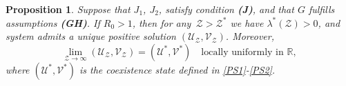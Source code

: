 \documentclass[a4paper,11pt]{amsart}
\newtheorem{proposition}[theorem]{Proposition}
\theoremstyle{definition}
\numberwithin{equation}{section}
\theoremstyle{definition}
\begin{document}
\begin{proposition}\label{Thecoexistence}
Suppose that $J_1$, $J_2$,  satisfy condition \textbf{(J)}, and that $G$ fulfills assumptions \textbf{(GH)}.
If $R_0 > 1$, then for any $\,\mathcal Z > \mathcal Z^{\ast}$ we have $\lambda^\ast(\mathcal{Z}) > 0$, and system  admits a unique positive solution $\left(\mathscr{U}_{\mathcal Z}, \mathscr{V}_{\mathcal Z}\right)$.
Moreover,
\begin{equation}\label{eq:limit-solution}
\lim_{\mathcal Z \to \infty} \left(\mathscr{U}_{\mathcal Z}, \mathscr{V}_{\mathcal Z}\right)
= (\mathscr{U}^{\ast}, \mathscr{V}^{\ast})
\quad \text{locally uniformly in } \mathbb{R},
\end{equation}
where $(\mathscr{U}^{\ast}, \mathscr{V}^{\ast})$ is the coexistence state defined in \eqref{PS1}-\eqref{PS2}.
\end{proposition}
\end{document}
